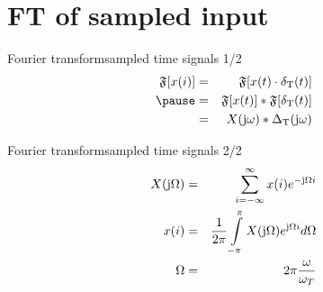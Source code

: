 \section{FT of sampled input}
	\begin{frame}{Fourier transform}{sampled time signals 1/2}
		\vspace{-5mm}
        \begin{eqnarray*}\label{eq:ft_sampled}
			\mathfrak{F}[x(i)] 	&=& \mathfrak{F}[x(t)\cdot \delta_\mathrm{T}(t)]\nonumber\\
			\pause
								&=& \mathfrak{F}[x(t)]\ast \mathfrak{F}[\delta_\mathrm{T}(t)]\nonumber\\
								&=& X(\jom)\ast \Delta_\mathrm{T}(\jom) \nonumber
		\end{eqnarray*}
	\end{frame}	
	\begin{frame}{Fourier transform}{sampled time signals 2/2}
        \begin{eqnarray*}
            X(\mathrm{j}\Omega) &=& \sum\limits_{i=-\infty}^{\infty} x(i)e^{-\mathrm{j}\Omega i}\\
            x(i) &=& \frac{1}{2\pi}\int\limits_{-\pi}^{\pi}X(\mathrm{j}\Omega)e^{\mathrm{j}\Omega i} d\Omega\\
            \Omega &=& 2\pi\frac{\omega}{\omega_T}
        \end{eqnarray*}
	\end{frame}	


